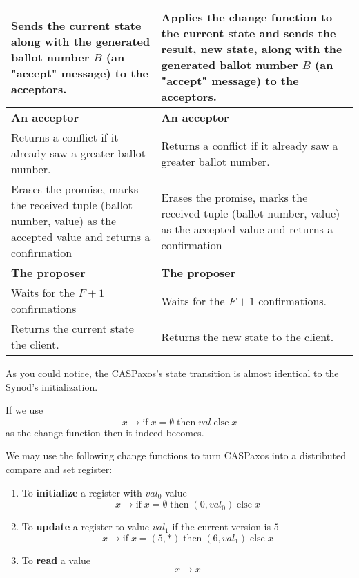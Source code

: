\documentclass[12pt]{article}
\theoremstyle{definition}
\begin{document}
\begin{center}
\begin{longtable}{p{15em}|p{15em}}
  
  Sends the current state along with the generated ballot number $B$ (an "accept" message) to the acceptors.
  &
  Applies the change function to the current state and sends the result, new state, along with the generated ballot number $B$ (an "accept" message) to the acceptors.
  \\[6pt]
  
  \hline
  
  {\bf An acceptor}
  &
  {\bf An acceptor} \\[6pt]
  
  
  Returns a conflict if it already saw a greater ballot number.
  &
  Returns a conflict if it already saw a greater ballot number.
  \\[6pt]
  
  
  Erases the promise, marks the received tuple (ballot number, value) as the accepted value and returns a confirmation
  &
  Erases the promise, marks the received tuple (ballot number, value) as the accepted value and returns a confirmation
  \\[6pt]
  
  \hline

  {\bf The proposer}
  &
  {\bf The proposer} \\[6pt]

  
  Waits for the $F+1$ confirmations
  &
  Waits for the $F+1$ confirmations. \\[6pt]
  
  
  Returns the current state the client.
  &
  Returns the new state to the client. \\[6pt]
  
  \hline
\end{longtable}
\end{center}

As you could notice, the CASPaxos's state transition is almost identical to the Synod's initialization. 

If we use
$$x \to \mbox{if}\; x = \emptyset \;\mbox{then}\; val\; \mbox{else}\; x$$
as the change function then it indeed becomes.

We may use the following change functions to turn CASPaxos into a distributed compare and set register:
\begin{enumerate}
  \item To {\bf initialize} a register with $val_0$ value
  $$x \to \mbox{if}\; x = \emptyset \;\mbox{then}\; (0, val_0)\; \mbox{else}\; x$$
  
  \item To {\bf update} a register to value $val_1$ if the current version is $5$
  $$x \to \mbox{if}\; x = (5, \ast) \;\mbox{then}\; (6, val_1)\; \mbox{else}\; x$$
  
  \item To {\bf read} a value
  $$x \to x$$
\end{enumerate}
\end{document}
